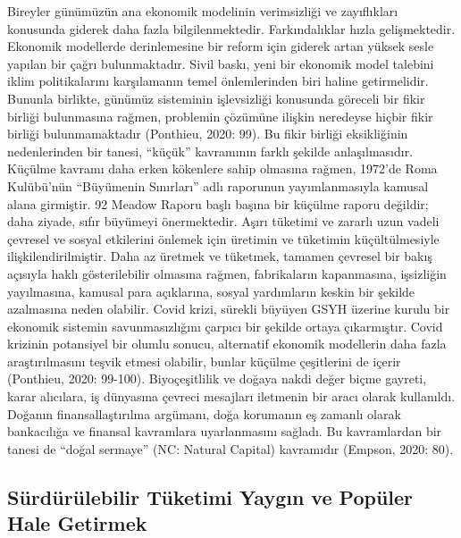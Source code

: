 \documentclass[
]{book}
\begin{document}
Bireyler günümüzün ana ekonomik modelinin verimsizliği ve zayıflıkları konusunda giderek daha fazla bilgilenmektedir. Farkındalıklar hızla gelişmektedir. Ekonomik modellerde derinlemesine bir reform için giderek artan yüksek sesle yapılan bir çağrı bulunmaktadır. Sivil baskı, yeni bir ekonomik model talebini iklim politikalarını karşılamanın temel önlemlerinden biri haline getirmelidir. Bununla birlikte, günümüz sisteminin işlevsizliği konusunda göreceli bir fikir birliği bulunmasına rağmen, problemin çözümüne ilişkin neredeyse hiçbir fikir birliği bulunmamaktadır (Ponthieu, 2020: 99). Bu fikir birliği eksikliğinin nedenlerinden bir tanesi, ``küçük'' kavramının farklı şekilde anlaşılmasıdır. Küçülme kavramı daha erken kökenlere sahip olmasına rağmen, 1972'de Roma Kulübü'nün ``Büyümenin Sınırları'' adlı raporunun yayımlanmasıyla kamusal alana girmiştir. 92 Meadow Raporu başlı başına bir küçülme raporu değildir; daha ziyade, sıfır büyümeyi önermektedir. Aşırı tüketimi ve zararlı uzun vadeli çevresel ve sosyal etkilerini önlemek için üretimin ve tüketimin küçültülmesiyle ilişkilendirilmiştir. Daha az üretmek ve tüketmek, tamamen çevresel bir bakış açısıyla haklı gösterilebilir olmasına rağmen, fabrikaların kapanmasına, işsizliğin yayılmasına, kamusal para açıklarına, sosyal yardımların keskin bir şekilde azalmasına neden olabilir. Covid krizi, sürekli büyüyen GSYH üzerine kurulu bir ekonomik sistemin savunmasızlığını çarpıcı bir şekilde ortaya çıkarmıştır. Covid krizinin potansiyel bir olumlu sonucu, alternatif ekonomik modellerin daha fazla araştırılmasını teşvik etmesi olabilir, bunlar küçülme çeşitlerini de içerir (Ponthieu, 2020: 99-100). Biyoçeşitlilik ve doğaya nakdi değer biçme gayreti, karar alıcılara, iş dünyasına çevreci mesajları iletmenin bir aracı olarak kullanıldı. Doğanın finansallaştırılma argümanı, doğa korumanın eş zamanlı olarak bankacılığa ve finansal kavramlara uyarlanmasını sağladı. Bu kavramlardan bir tanesi de ``doğal sermaye'' (NC: Natural Capital) kavramıdır (Empson, 2020: 80).

\hypertarget{suxfcrduxfcruxfclebilir-tuxfcketimi-yaygux131n-ve-popuxfcler-hale-getirmek}{%
\subsection{Sürdürülebilir Tüketimi Yaygın ve Popüler Hale Getirmek}\label{suxfcrduxfcruxfclebilir-tuxfcketimi-yaygux131n-ve-popuxfcler-hale-getirmek}}
\end{document}
